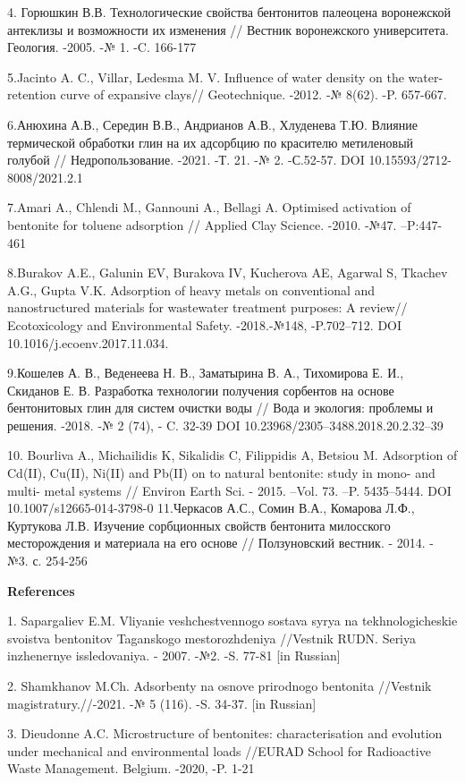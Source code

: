 4. Горюшкин В.В. Технологические свойства бентонитов палеоцена
воронежской антеклизы и возможности их изменения // Вестник воронежского
университета. Геология. -2005. -№ 1. -C. 166-177

5.Jacinto A. C., Villar, Ledesma M. V. Influence of water density on the
water-retention curve of expansive clays// Geotechnique. -2012. -№
8(62). -P. 657-667.

6.Анюхина А.В., Середин В.В., Андрианов А.В., Хлуденева Т.Ю. Влияние
термической обработки глин на их адсорбцию по красителю метиленовый
голубой // Недропользование. -2021. -Т. 21. -№ 2. -С.52-57. DOI
10.15593/2712-8008/2021.2.1

7.Amari A., Chlendi M., Gannouni A., Bellagi A. Optimised activation of
bentonite for toluene adsorption // Applied Clay Science. -2010. -№47.
--P:447-461

8.Burakov A.E., Galunin EV, Burakova IV, Kucherova AE, Agarwal S,
Tkachev A.G., Gupta V.K. Adsorption of heavy metals on conventional and
nanostructured materials for wastewater treatment purposes: A review//
Ecotoxicology and Environmental Safety. -2018.-№148, -P.702--712. DOI
10.1016/j.ecoenv.2017.11.034.

9.Кошелев А. В., Веденеева Н. В., Заматырина В. А., Тихомирова Е. И.,
Скиданов Е. В. Разработка технологии получения сорбентов на основе
бентонитовых глин для систем очистки воды // Вода и экология: проблемы и
решения. -2018. -№ 2 (74), - C. 32-39 DOI
10.23968/2305--3488.2018.20.2.32--39

10. Bourliva A., Michailidis K, Sikalidis C, Filippidis A, Betsiou M.
Adsorption of Cd(II), Cu(II), Ni(II) and Pb(II) on to natural bentonite:
study in mono- and multi- metal systems // Environ Earth Sci. - 2015.
--Vol. 73. --P. 5435--5444. DOI 10.1007/s12665-014-3798-0 11.Черкасов
А.С., Сомин В.А., Комарова Л.Ф., Куртукова Л.В. Изучение сорбционных
свойств бентонита милосского месторождения и материала на его основе //
Ползуновский вестник. - 2014. - №3. с. 254-256

\textbf{References}

1. Sapargaliev E.M. Vliyanie veshchestvennogo sostava
syr\textquotesingle ya na tekhnologicheskie svoistva bentonitov
Taganskogo mestorozhdeniya //Vestnik RUDN. Seriya inzhenernye
issledovaniya. - 2007. -№2. -S. 77-81 {[}in Russian{]}

2. Shamkhanov M.Ch. Adsorbenty na osnove prirodnogo bentonita //Vestnik
magistratury.//-2021. -№ 5 (116). -S. 34-37. {[}in Russian{]}

3. Dieudonne A.C. Microstructure of bentonites: characterisation and
evolution under mechanical and environmental loads //EURAD School for
Radioactive Waste Management. Belgium. -2020, -P. 1-21

